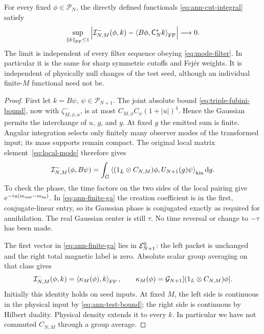 \begin{theorem}
For every fixed $\phi\in\mathcal P_N$, the directly defined functionals
\eqref{eq:ann-cut-integral} satisfy
\begin{equation}
 \sup_{\left\lVert k\right\rVert_{\mathrm{FP}}\le1}
 \left|\mathcal I^-_{N,M}(\phi,k)
       -\left\langle B\phi,\mathsf C_N^*k\right\rangle_{\mathrm{FP}}\right|
 \longrightarrow0.
 \label{eq:ann-dual-limit}
\end{equation}
The limit is independent of every filter sequence obeying
\eqref{eq:mode-filter}. In particular it is the same for sharp symmetric
cutoffs and Fej\'er weights. It is independent of physically null changes
of the test seed, although an individual finite-$M$ functional need not be.
\label{thm:ann-integrated}
\end{theorem}
\begin{proof}
First let $k=B\psi$, $\psi\in\mathcal P_{N+1}$. The joint absolute bound
\eqref{eq:triple-fubini-bound}, now with $\zeta^-_{M,\phi,u}$, is at most
$C_{M,\phi}C_\psi(1+|u|)^4$. Hence the Gaussian permits the interchange
of $u$, $g$, and $y$. At fixed $g$ the emitted sum is finite. Angular
integration selects only finitely many observer modes of the transformed
input; its mass supports remain compact. The original local matrix
element~\eqref{eq:local-mode} therefore gives
\begin{equation}
 \mathcal I^-_{N,M}(\phi,B\psi)
 =\int_G\left\langle(1_L\otimes C_{N,M})\phi,U_{N+1}(g)\psi\right\rangle_{\rm kin}\mathop{}\!\mathrm d g.
 \label{eq:ann-finite-ga}
\end{equation}
To check the phase, the time factors on the two sides of the local
pairing give $e^{-iu(m_{\rm out}-m_{\rm in})}$. In
\eqref{eq:ann-finite-ga} the creation coefficient is in the first,
conjugate-linear entry, so its Gaussian phase is conjugated exactly as
required for annihilation. The real Gaussian center is still $\tau$.
No time reversal or change to $-\tau$ has been made.

The first vector in \eqref{eq:ann-finite-ga} lies in $\mathcal E_{N+1}^0$:
the left packet is unchanged and the right total magnetic label is zero.
Absolute scalar group averaging on that class gives
\begin{equation}
 \mathcal I^-_{N,M}(\phi,k)=\left\langle\kappa_M(\phi),k\right\rangle_{\mathrm{FP}},\qquad
 \kappa_M(\phi)=\mathcal G_{N+1}[(1_L\otimes C_{N,M})\phi].
 \label{eq:ann-riesz}
\end{equation}
Initially this identity holds on seed inputs. At fixed $M$, the left side
is continuous in the physical input by \eqref{eq:ann-test-bound}; the
right side is continuous by Hilbert duality. Physical density extends it
to every $k$. In particular we have not commuted $C_{N,M}$ through a
group average.


\end{proof}
